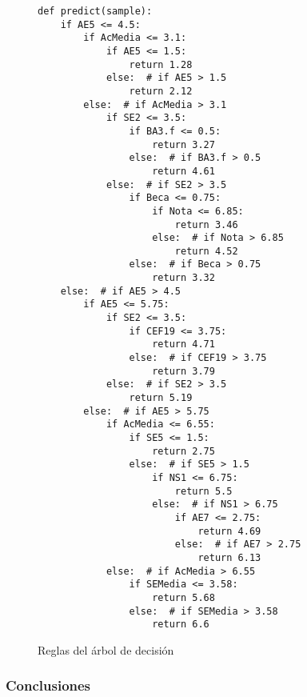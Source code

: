 \begin{figure}[!htbp]
	\begin{lstlisting}
def predict(sample):
    if AE5 <= 4.5:
        if AcMedia <= 3.1:
            if AE5 <= 1.5:
                return 1.28
            else:  # if AE5 > 1.5
                return 2.12
        else:  # if AcMedia > 3.1
            if SE2 <= 3.5:
                if BA3.f <= 0.5:
                    return 3.27
                else:  # if BA3.f > 0.5
                    return 4.61
            else:  # if SE2 > 3.5
                if Beca <= 0.75:
                    if Nota <= 6.85:
                        return 3.46
                    else:  # if Nota > 6.85
                        return 4.52
                else:  # if Beca > 0.75
                    return 3.32
    else:  # if AE5 > 4.5
        if AE5 <= 5.75:
            if SE2 <= 3.5:
                if CEF19 <= 3.75:
                    return 4.71
                else:  # if CEF19 > 3.75
                    return 3.79
            else:  # if SE2 > 3.5
                return 5.19
        else:  # if AE5 > 5.75
            if AcMedia <= 6.55:
                if SE5 <= 1.5:
                    return 2.75
                else:  # if SE5 > 1.5
                    if NS1 <= 6.75:
                        return 5.5
                    else:  # if NS1 > 6.75
                        if AE7 <= 2.75:
                            return 4.69
                        else:  # if AE7 > 2.75
                            return 6.13
            else:  # if AcMedia > 6.55
                if SEMedia <= 3.58:
                    return 5.68
                else:  # if SEMedia > 3.58
                    return 6.6
	\end{lstlisting}
\caption{Reglas del árbol de decisión}
\label{fig:tree_rules}
\end{figure}
\pagebreak
\subsubsection{Conclusiones}
